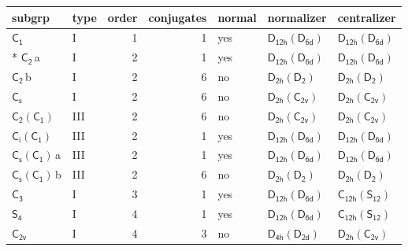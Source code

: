 \documentclass[10pt,a4paper]{article}
\numberwithin{equation}{section}
\newcommand{\grp}[1]{\mathsf{#1}}
\newcommand{\clsletter}[1]{\,{\scriptsize\color{black!55}#1}}
\begin{document}
{\small\begin{longtable}{@{}llrrlll@{}}\toprule
subgrp & type & order & conjugates & normal & normalizer & centralizer\\\midrule\endhead
\bottomrule\endfoot\endlastfoot
\href{../../../rotation/data/pdf/C1.pdf}{$\grp{C_{1}}$} & I & 1 & 1 & yes & \href{D12h-D6d.pdf}{$\grp{D_{12h}}(\grp{D_{6d}})$} & \href{D12h-D6d.pdf}{$\grp{D_{12h}}(\grp{D_{6d}})$}\\*
\href{../../../rotation/data/pdf/C2.pdf}{$\grp{C_{2}}$}\clsletter{a} & I & 2 & 1 & yes & \href{D12h-D6d.pdf}{$\grp{D_{12h}}(\grp{D_{6d}})$} & \href{D12h-D6d.pdf}{$\grp{D_{12h}}(\grp{D_{6d}})$}\\
\href{../../../rotation/data/pdf/C2.pdf}{$\grp{C_{2}}$}\clsletter{b} & I & 2 & 6 & no & \href{D2h-D2.pdf}{$\grp{D_{2h}}(\grp{D_{2}})$} & \href{D2h-D2.pdf}{$\grp{D_{2h}}(\grp{D_{2}})$}\\
\href{../../../rotation/data/pdf/C1v.pdf}{$\grp{C_{s}}$} & I & 2 & 6 & no & \href{D2h-C2v.pdf}{$\grp{D_{2h}}(\grp{C_{2v}})$} & \href{D2h-C2v.pdf}{$\grp{D_{2h}}(\grp{C_{2v}})$}\\
\href{C2-C1.pdf}{$\grp{C_{2}}(\grp{C_{1}})$} & III & 2 & 6 & no & \href{D2h-C2v.pdf}{$\grp{D_{2h}}(\grp{C_{2v}})$} & \href{D2h-C2v.pdf}{$\grp{D_{2h}}(\grp{C_{2v}})$}\\
\href{S2-C1.pdf}{$\grp{C_{i}}(\grp{C_{1}})$} & III & 2 & 1 & yes & \href{D12h-D6d.pdf}{$\grp{D_{12h}}(\grp{D_{6d}})$} & \href{D12h-D6d.pdf}{$\grp{D_{12h}}(\grp{D_{6d}})$}\\
\href{C1v-C1.pdf}{$\grp{C_{s}}(\grp{C_{1}})$}\clsletter{a} & III & 2 & 1 & yes & \href{D12h-D6d.pdf}{$\grp{D_{12h}}(\grp{D_{6d}})$} & \href{D12h-D6d.pdf}{$\grp{D_{12h}}(\grp{D_{6d}})$}\\
\href{C1v-C1.pdf}{$\grp{C_{s}}(\grp{C_{1}})$}\clsletter{b} & III & 2 & 6 & no & \href{D2h-D2.pdf}{$\grp{D_{2h}}(\grp{D_{2}})$} & \href{D2h-D2.pdf}{$\grp{D_{2h}}(\grp{D_{2}})$}\\
\href{../../../rotation/data/pdf/C3.pdf}{$\grp{C_{3}}$} & I & 3 & 1 & yes & \href{D12h-D6d.pdf}{$\grp{D_{12h}}(\grp{D_{6d}})$} & \href{C12h-S12.pdf}{$\grp{C_{12h}}(\grp{S_{12}})$}\\
\href{../../../rotation/data/pdf/S4.pdf}{$\grp{S_{4}}$} & I & 4 & 1 & yes & \href{D12h-D6d.pdf}{$\grp{D_{12h}}(\grp{D_{6d}})$} & \href{C12h-S12.pdf}{$\grp{C_{12h}}(\grp{S_{12}})$}\\
\href{../../../rotation/data/pdf/C2v.pdf}{$\grp{C_{2v}}$} & I & 4 & 3 & no & \href{D4h-D2d.pdf}{$\grp{D_{4h}}(\grp{D_{2d}})$} & \href{D2h-C2v.pdf}{$\grp{D_{2h}}(\grp{C_{2v}})$}\\

\end{longtable}}
\end{document}
